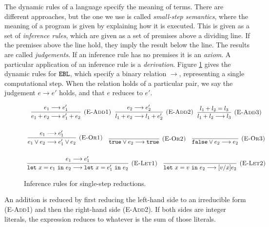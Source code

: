 The dynamic rules of a language specify the meaning of terms. There are different approaches, but the one we use is called \textit{small-step semantics}, where the meaning of a program is given by explaining how it is executed. This is given as a set of \textit{inference rules}, which are given as a set of premises above a dividing line. If the premises above the line hold, they imply the result below the line. The results are called \textit{judgements}. If an inference rule has no premises it is an \textit{axiom}. A particular application of an inference rule is a \textit{derivation}. Figure \ref{fig:ebl_dynamic} gives the dynamic rules for $\mathtt{EBL}$, which specify a binary relation $\longrightarrow$, representing a single computational step. When the relation holds of a particular pair, we say the judgement $e \longrightarrow e'$ holds, and that $e$ reduces to $e'$. 

\begin{figure}[h]

\noindent
{}

\[
\begin{array}{c}

\infer[\textsc{(E-Add1)}]
	{e_1 + e_2 \longrightarrow e_1' + e_2}
	{e_1 \longrightarrow e_1'}
~~
\infer[\textsc{(E-Add2)}]
	{l_1 + e_2 \longrightarrow l_1 + e_2'}
	{e_2 \longrightarrow e_2'}
~~
\infer[\textsc{(E-Add3)}]
	{l_1 + l_2 \longrightarrow l_3}
	{l_1 + l_2 = l_3} \\[4ex]

\infer[\textsc{(E-Or1)}]
	{e_1 \lor e_2 \longrightarrow e_1' \lor e_2}
	{e_1 \longrightarrow e_1'}
	~~~
\infer[\textsc{(E-Or2)}]
	{\true \lor e_2 \longrightarrow \true}
	{}
	~~~
\infer[\textsc{(E-Or3)}]
	{\false \lor e_2 \longrightarrow e_2}
	{}\\[4ex]
	
\infer[\textsc{(E-Let1)}]
	{\letxpr{x}{e_1}{e_2} \longrightarrow \letxpr{x}{e_1'}{e_2}}
	{e_1 \longrightarrow e_1'}
	~~~
\infer[\textsc{(E-Let2)}]
	{\letxpr{x}{v}{e_2} \longrightarrow [v/x]e_2}
	{}

\end{array}
\]

\vspace{-12pt}
\caption{Inference rules for single-step reductions.}
\label{fig:ebl_dynamic}
\end{figure}

An addition is reduced by first reducing the left-hand side to an irreducible form (\textsc{E-Add1}) and then the right-hand side (\textsc{E-Add2}). If both sides are integer literals, the expression reduces to whatever is the sum of those literals.

